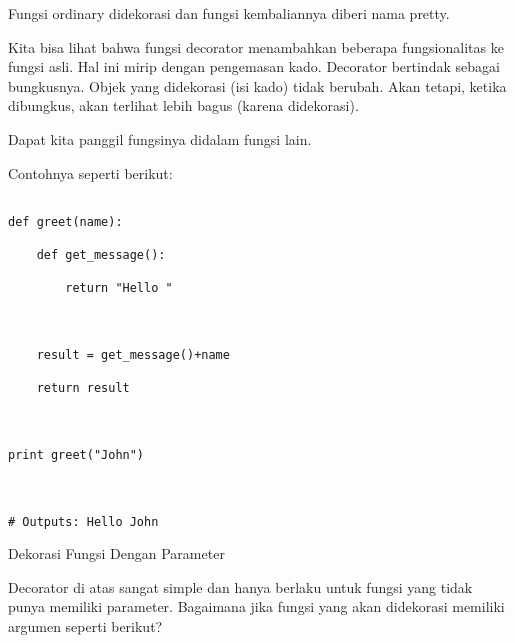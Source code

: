 Fungsi ordinary didekorasi dan fungsi kembaliannya diberi nama pretty.

Kita bisa lihat bahwa fungsi decorator menambahkan beberapa fungsionalitas ke fungsi asli. Hal ini mirip dengan pengemasan kado. Decorator bertindak sebagai bungkusnya. Objek yang didekorasi (isi kado) tidak berubah. Akan tetapi, ketika dibungkus, akan terlihat lebih bagus (karena didekorasi).



Dapat kita panggil fungsinya didalam fungsi lain.

Contohnya seperti berikut:



\begin{verbatim}

def greet(name):

    def get_message():

        return "Hello "



    result = get_message()+name

    return result



print greet("John")



# Outputs: Hello John

\end{verbatim}





Dekorasi Fungsi Dengan Parameter



Decorator di atas sangat simple dan hanya berlaku untuk fungsi yang tidak punya memiliki parameter. Bagaimana jika fungsi yang akan didekorasi memiliki argumen seperti berikut?

